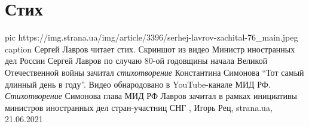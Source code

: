  
 
 
 
 
\chapter{Стих}

\ifcmt
  pic https://img.strana.ua/img/article/3396/serhej-lavrov-zachital-76_main.jpeg
	caption Сергей Лавров читает стих. Скриншот из видео 
\fi
Министр иностранных дел России Сергей Лавров по случаю 80-ой годовщины начала
Великой Отечественной войны зачитал \emph{стихотворение} Константина Симонова
\enquote{Тот самый длинный день в году}.  Видео обнародовано в YouTube-канале
МИД РФ.  \emph{Стихотворение} Симонова глава МИД РФ Лавров зачитал в рамках
инициативы министров иностранных дел стран-участниц СНГ
, 
Игорь Рец, strana.ua, 21.06.2021
